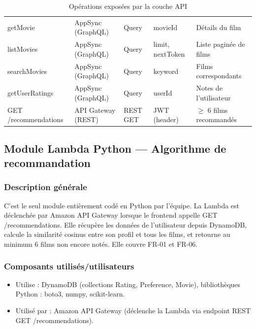 \documentclass[a4paper,12pt]{report}
\begin{document}
\begin{table}[htbp]
\begin{tabular}{p{3cm} p{3cm} p{2cm} p{3.5cm} p{4cm}}
getMovie & AppSync \newline(GraphQL) & Query & movieId & Détails du film \\

listMovies & AppSync \newline(GraphQL) & Query & limit, nextToken & Liste paginée de films \\

searchMovies & AppSync \newline(GraphQL) & Query & keyword & Films correspondants \\

getUserRatings & AppSync \newline(GraphQL) & Query & userId & Notes de l'utilisateur \\

GET /recommendations & API Gateway (REST) & REST GET & JWT (header) & $\geq$ 6 films recommandés \\

\bottomrule
\end{tabular}
\caption{Opérations exposées par la couche API}
\end{table}
\newpage
\subsection{Module Lambda Python — Algorithme de recommandation }
\label{lamb}
\subsubsection{Description générale}
C'est le seul module entièrement codé en Python par l'équipe. La Lambda est déclenchée par Amazon API Gateway lorsque le frontend appelle GET /recommendations. Elle récupère les données de l'utilisateur depuis DynamoDB, calcule la similarité cosinus entre son profil et tous les films, et retourne au minimum 6 films non encore notés. Elle couvre FR-01 et FR-06.
\subsubsection{Composants utilisés/utilisateurs}
\begin{itemize}
    \item Utilise : DynamoDB (collections Rating, Preference, Movie), bibliothèques Python : boto3, numpy, scikit-learn.
    \item Utilisé par : Amazon API Gateway (déclenche la Lambda via endpoint REST GET /recommendations).
\end{itemize}
\end{document}
